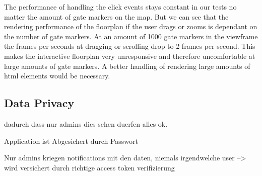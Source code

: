 The performance of handling the click events stays constant in our tests no matter the amount of gate markers on the map. But we can see that the rendering performance of the floorplan if the user drags or zooms is dependant on the number of gate markers. At an amount of 1000 gate markers in the viewframe the frames per seconds at dragging or scrolling drop to 2 frames per second. This makes the interactive floorplan very unresponsive and therefore uncomfortable at large amounts of gate markers. A better handling of rendering large amounts of html elements would be necessary.

\subsection{Data Privacy}
\label{Data Privacy}

dadurch dass nur admins dies sehen duerfen alles ok.

Application ist Abgesichert durch Passwort

Nur admins kriegen notifications mit den daten, niemals irgendwelche user
--> wird versichert durch richtige access token verifizierung


\clearpage